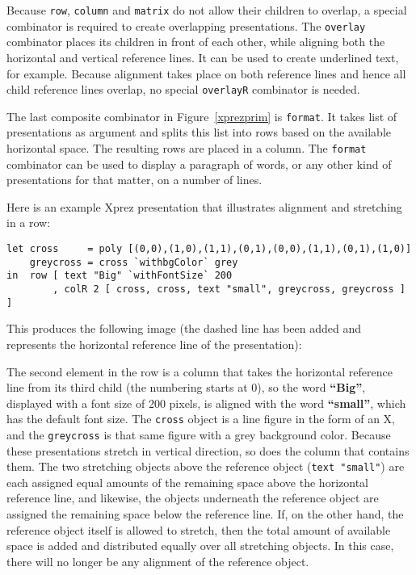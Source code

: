 Because \texttt{row}, \texttt{column} and \texttt{matrix} do not allow their children to overlap, a special combinator is required to create overlapping presentations. The \texttt{overlay} combinator places its children in front of each other, while aligning both the horizontal and vertical reference lines. It can be used to create underlined text, for example. Because alignment takes place on both reference lines and hence all child reference lines overlap, no special \texttt{overlayR} combinator is needed. 

The last composite combinator in Figure~\ref{xprezprim} is \texttt{format}. It takes list of presentations as argument and splits this list into rows based on the available horizontal space. The resulting rows are placed in a column. The \texttt{format} combinator can be used to display a paragraph of words, or any other kind of presentations for that matter, on a number of lines. 

Here is an example {\sc Xprez} presentation that illustrates alignment and stretching in a row:

\begin{small}
\begin{verbatim}
let cross     = poly [(0,0),(1,0),(1,1),(0,1),(0,0),(1,1),(0,1),(1,0)]
    greycross = cross `withbgColor` grey
in  row [ text "Big" `withFontSize` 200
        , colR 2 [ cross, cross, text "small", greycross, greycross ] ] 
\end{verbatim}
\end{small}

\noindent This produces the following image (the dashed line has been added and represents the horizontal reference line of the presentation):

\begin{center}
\end{center}

The second element in the row is a column that takes the horizontal reference line from its third child (the numbering starts at 0), so the word {\bf ``Big''}, displayed with a font size of 200 pixels, is aligned with the word {\bf ``small''}, which has the default font size. The \texttt{cross} object is a line figure in the form of an X, and the \texttt{greycross} is that same figure with a grey background color. Because these presentations stretch in vertical direction, so does the column that contains them. The two stretching objects above the reference object (\texttt{text "small"}) are each assigned equal amounts of the remaining space above the horizontal reference line, and likewise, the objects underneath the reference object are assigned the remaining space below the reference line. If, on the other hand, the reference object itself is allowed to stretch, then the total amount of available space is added and distributed equally over all stretching objects. In this case, there will no longer be any alignment of the reference object. 


